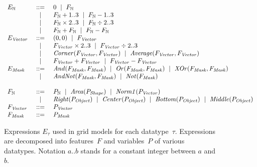 \documentclass[a4paper]{llncs}
\newenvironment{datatype}{$\begin{array}{lcl}}{\end{array}$}
\newcommand{\is}{&\ ::=\ &}
\newcommand{\alter}{\ \mid\ }
\newcommand{\altis}{\\ &\ \mid\ &}
\newcommand{\nat}{\mathbb{N}}
\begin{document}
\begin{figure}[t]
\begin{center}
  \begin{datatype}
    E_\nat \is 0 \alter F_\nat
    \altis F_\nat + 1..3 \alter F_\nat - 1..3
    \altis F_\nat \times 2..3 \alter F_\nat \div 2..3
    \altis F_\nat + F_\nat \alter F_\nat - F_\nat
    \\
    E_{\it Vector} \is (0,0) \alter F_{\it Vector}
    \altis F_{\it Vector} \times 2..3 \alter F_{\it Vector} \div 2..3
    \altis {\it Corner}(F_{\it Vector}, F_{\it Vector}) \alter {\it Average}(F_{\it Vector}, F_{\it Vector})
    \altis F_{\it Vector} + F_{\it Vector} \alter F_{\it Vector} - F_{\it Vector}
    \\
    E_{\it Mask} \is {\it And}(F_{\it Mask},F_{\it Mask}) \alter {\it Or}(F_{\it Mask},F_{\it Mask}) \alter {\it XOr}(F_{\it Mask},F_{\it Mask})
    \altis {\it AndNot}(F_{\it Mask},F_{\it Mask}) \alter {\it Not}(F_{\it Mask})
    \\
    \\
    F_\nat \is P_\nat \alter {\it Area}(P_{\it Shape}) \alter {\it Norm1}(P_{\it Vector})
    \altis {\it Right}(P_{\it Object}) \alter {\it Center}(P_{\it Object}) \alter {\it Bottom}(P_{\it Object}) \alter {\it Middle}(P_{\it Object})
    \\
    F_{\it Vector} \is P_{\it Vector}
    \\
    F_{\it Mask} \is P_{\it Mask}
  \end{datatype}
\end{center}
\caption{Expressions $E_\tau$ used in grid models for each
  datatype~$\tau$. Expressions are decomposed into features~$F$ and
  variables~$P$ of various datatypes. Notation $a..b$ stands for
  a constant integer between $a$ and $b$.}
\label{fig:expressions}
\end{figure}
\end{document}
